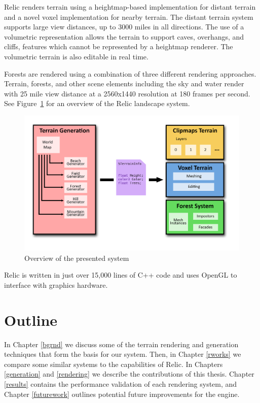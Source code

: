 Relic renders terrain using a heightmap-based implementation for distant terrain and a novel voxel implementation for nearby terrain.
The distant terrain system supports large view distances, up to 3000 miles in all directions.
The use of a volumetric representation allows the terrain to support caves, overhangs, and cliffs, features which cannot be represented by a heightmap renderer.
The volumetric terrain is also editable in real time.

Forests are rendered using a combination of three different rendering approaches.
Terrain, forests, and other scene elements including the sky and water render with 25 mile view distance at a 2560x1440 resolution at 180 frames per second.
See Figure~\ref{fig:system1} for an overview of the Relic landscape system.

\begin{figure}
  \centering
    \includegraphics[width=1.0\textwidth]{figures/SystemDiagram.png}
  \caption{Overview of the presented system}
  \label{fig:system1}
\end{figure}

Relic is written in just over 15,000 lines of C++ code and uses OpenGL to interface with graphics hardware.


\section{Outline}

In Chapter \ref{bgrnd} we discuss some of the terrain rendering and generation techniques that form the basis for our system.
Then, in Chapter \ref{rworks} we compare some similar systems to the capabilities of Relic.
In Chapters \ref{generation} and \ref{rendering} we describe the contributions of this thesis.
Chapter \ref{results} contains the performance validation of each rendering system, and Chapter \ref{futurework} outlines potential future improvements for the engine.
